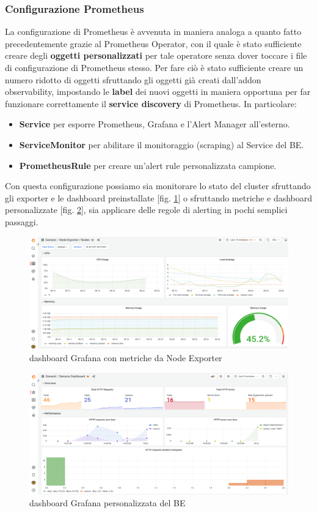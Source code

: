 \subsubsection{Configurazione Prometheus}
La configurazione di Prometheus è avvenuta in maniera analoga a quanto fatto precedentemente grazie al Prometheus Operator, con il quale è stato sufficiente creare degli \textbf{oggetti personalizzati} per tale operatore senza dover toccare i file di configurazione di Prometheus stesso. Per fare ciò è stato sufficiente creare un numero ridotto di oggetti sfruttando gli oggetti già creati dall'addon observability, impostando le \textbf{label} dei nuovi oggetti in maniera opportuna per far funzionare correttamente il \textbf{service discovery} di Prometheus. In particolare:
\begin{itemize}
    \item \textbf{Service} per esporre Prometheus, Grafana e l'Alert Manager all'esterno.
    \item \textbf{ServiceMonitor} per abilitare il monitoraggio (scraping) al Service del BE.
    \item \textbf{PrometheusRule} per creare un'alert rule personalizzata campione.
\end{itemize}

Con questa configurazione possiamo sia monitorare lo stato del cluster sfruttando gli exporter e le dashboard preinstallate [fig. \ref{fig:grafana-cluster}] o sfruttando metriche e dashboard personalizzate [fig. \ref{fig:grafana-sensor}], sia applicare delle regole di alerting in pochi semplici passaggi.
\\
\begin{figure} [ht]
    \centering
    \includegraphics[width=1\linewidth]{UNINA_BSc_Final_Report//img//explanation/grafana_example_white.png}
    \caption{dashboard Grafana con metriche da Node Exporter}
    \label{fig:grafana-cluster}
\end{figure}

\begin{figure} [ht]
    \centering
    \includegraphics[width=1\linewidth]{UNINA_BSc_Final_Report//img//explanation/grafana_sensor_example_white.png}
    \caption{dashboard Grafana personalizzata del BE}
    \label{fig:grafana-sensor}
\end{figure}